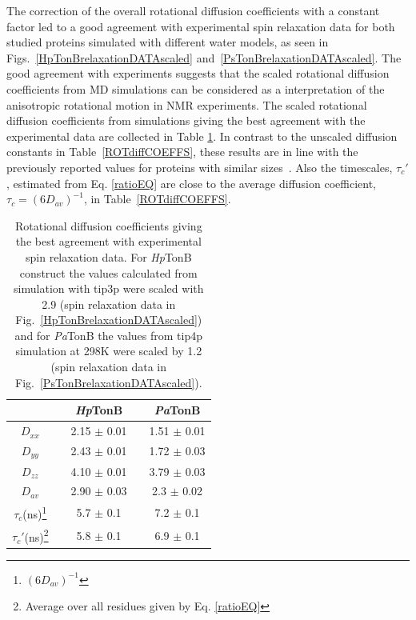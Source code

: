 \documentclass[pre,aps,floatfix,authordate1-4,twocolumn]{revtex4-1}
\begin{document}
The correction of the overall rotational diffusion coefficients
with a constant factor led to a good agreement with experimental
spin relaxation data for both studied proteins simulated with different water models,
as seen in Figs.~\ref{HpTonBrelaxationDATAscaled} and~\ref{PsTonBrelaxationDATAscaled}.
The good agreement with experiments suggests that the scaled rotational diffusion coefficients
from MD simulations can be considered as a interpretation of the anisotropic rotational motion in NMR experiments.
The scaled rotational diffusion coefficients from simulations giving the best agreement
with the experimental data are collected in Table \ref{ROTdiffCOEFFSscaled}.
In contrast to the unscaled diffusion constants in Table~\ref{ROTdiffCOEFFS},
these results are in line with the previously reported values for proteins
with similar sizes~\cite{krishnan98}. Also the timescales, $\tau_{c}'$, estimated from 
Eq. \ref{ratioEQ} are close to the average diffusion coefficient, $\tau_{c}=(6D_{av})^{-1}$,
in Table~\ref{ROTdiffCOEFFS}.
\begin{table}[!h]
  \centering
  \caption{Rotational diffusion coefficients giving the best agreement with experimental spin relaxation data.
    For {\it Hp}TonB construct the values calculated from simulation with tip3p were scaled with 2.9
    (spin relaxation data in Fig.~\ref{HpTonBrelaxationDATAscaled}) and  for {\it Pa}TonB
    the values from tip4p simulation at 298K were scaled by 1.2 (spin relaxation data in
    Fig.~\ref{PsTonBrelaxationDATAscaled}). 
  }\label{ROTdiffCOEFFSscaled}
  \begin{tabular}{c c c c c}
    &    &  {\it Hp}TonB  &  & {\it Pa}TonB \\
    \hline
    $D_{xx}$        &    &   2.15 $\pm$ 0.01  & & 1.51  $\pm$ 0.01\\
    $D_{yy}$        &    &  2.43  $\pm$ 0.01  & & 1.72  $\pm$ 0.03\\
    $D_{zz}$        &    &  4.10   $\pm$ 0.01 & & 3.79  $\pm$ 0.03\\
    $D_{av}$        &    &   2.90  $\pm$ 0.03  & & 2.3  $\pm$ 0.02\\
    $\tau_{c}$(ns)\footnote{$(6D_{av})^{-1}$}  &    &  5.7   $\pm$ 0.1  & & 7.2 $\pm$ 0.1 \\
    $\tau_{c}'$(ns)\footnote{Average over all residues given by Eq. \ref{ratioEQ}}  &    &  5.8   $\pm$ 0.1 & & 6.9   $\pm$ 0.1 \\
\end{tabular}
\end{table} 
\end{document}
